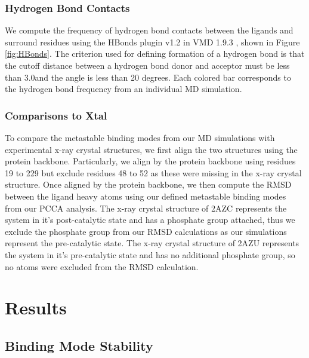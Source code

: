 \documentclass[fleqn,10pt]{wlscirep}
\newcommand{\angstrom}{\text{\normalfont\AA}}
\begin{document}
\subsubsection{Hydrogen Bond Contacts}

We compute the frequency of hydrogen bond contacts between the ligands and surround residues using the HBonds plugin v1.2 \cite{} in VMD 1.9.3 \cite{}, shown in Figure \ref{fig:HBonds}.
The criterion used for defining formation of a hydrogen bond is that the cutoff distance between a hydrogen bond donor and acceptor must be less than 3.0\angstrom and the angle is less than 20 degrees.
Each colored bar corresponds to the hydrogen bond frequency from an individual MD simulation.


\subsubsection{Comparisons to Xtal}
To compare the metastable binding modes from our MD simulations with experimental x-ray crystal structures, we first align the two structures using the protein backbone.
Particularly, we align by the protein backbone using residues 19 to 229 but exclude residues 48 to 52 as these were missing in the x-ray crystal structure.
Once aligned by the protein backbone, we then compute the RMSD between the ligand heavy atoms using our defined metastable binding modes from our PCCA analysis.
The x-ray crystal structure of 2AZC represents the system in it's post-catalytic state and has a phosphate group attached, thus we exclude the phosphate group from our RMSD calculations as our simulations represent the pre-catalytic state.
The x-ray crystal structure of 2AZU represents the system in it's pre-catalytic state and has no additional phosphate group, so no atoms were excluded from the RMSD calculation.


\section{Results}

\subsection{Binding Mode Stability}
\end{document}
